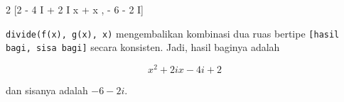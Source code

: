 \documentclass[a4paper,11pt,oneside,enabledeprecatedfontcommands]{scrbook}
\newenvironment{eulernotebook}{}{}
\newenvironment{eulercomment}{\par\medskip\noindent}{\par\medskip}
\newenvironment{eulerformula}{}{}
\begin{document}
\begin{eulernotebook}
\begin{euleroutput}
                                                      2
                                  [2 - 4 I + 2 I x + x , - 6 - 2 I]
\end{euleroutput}
\begin{eulercomment}
\texttt{divide(f(x), g(x), x)} mengembalikan kombinasi dua ruas bertipe \texttt{[hasil bagi, sisa bagi]} secara konsisten. Jadi, hasil baginya adalah
\end{eulercomment}
\begin{eulerformula}
\[
x^2+2ix-4i+2
\]
\end{eulerformula}
\begin{eulercomment}
dan sisanya adalah $-6 - 2i$.
\end{eulercomment}

\end{eulernotebook}
\end{document}
